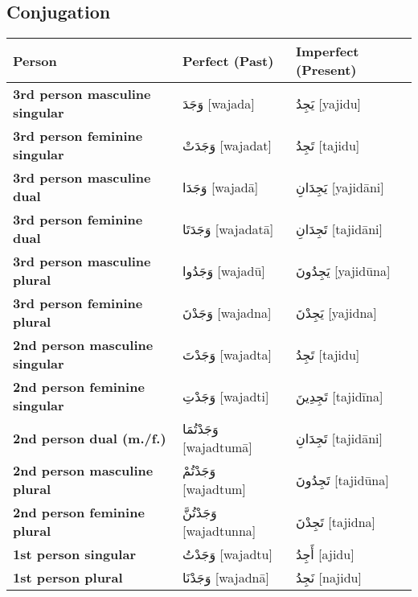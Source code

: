 \documentclass[letter,12pt]{article}
\begin{document}
\subsection{Conjugation}
\begin{longtable}{|>{\raggedright}p{3.5cm}|p{5cm}|p{5cm}|}
\hline
\textbf{Person} & \textbf{Perfect (Past)} & \textbf{Imperfect (Present)} \\
\hline
\textbf{3rd person masculine singular} & \textarabic{وَجَدَ} [wajada] & \textarabic{يَجِدُ} [yajidu] \\
\hline
\textbf{3rd person feminine singular} & \textarabic{وَجَدَتْ} [wajadat] & \textarabic{تَجِدُ} [tajidu] \\
\hline
\textbf{3rd person masculine dual} & \textarabic{وَجَدَا} [wajadā] & \textarabic{يَجِدَانِ} [yajidāni] \\
\hline
\textbf{3rd person feminine dual} & \textarabic{وَجَدَتَا} [wajadatā] & \textarabic{تَجِدَانِ} [tajidāni] \\
\hline
\textbf{3rd person masculine plural} & \textarabic{وَجَدُوا} [wajadū] & \textarabic{يَجِدُونَ} [yajidūna] \\
\hline
\textbf{3rd person feminine plural} & \textarabic{وَجَدْنَ} [wajadna] & \textarabic{يَجِدْنَ} [yajidna] \\
\hline
\textbf{2nd person masculine singular} & \textarabic{وَجَدْتَ} [wajadta] & \textarabic{تَجِدُ} [tajidu] \\
\hline
\textbf{2nd person feminine singular} & \textarabic{وَجَدْتِ} [wajadti] & \textarabic{تَجِدِينَ} [tajidīna] \\
\hline
\textbf{2nd person dual (m./f.)} & \textarabic{وَجَدْتُمَا} [wajadtumā] & \textarabic{تَجِدَانِ} [tajidāni] \\
\hline
\textbf{2nd person masculine plural} & \textarabic{وَجَدْتُمْ} [wajadtum] & \textarabic{تَجِدُونَ} [tajidūna] \\
\hline
\textbf{2nd person feminine plural} & \textarabic{وَجَدْتُنَّ} [wajadtunna] & \textarabic{تَجِدْنَ} [tajidna] \\
\hline
\textbf{1st person singular} & \textarabic{وَجَدْتُ} [wajadtu] & \textarabic{أَجِدُ} [ajidu] \\
\hline
\textbf{1st person plural} & \textarabic{وَجَدْنَا} [wajadnā] & \textarabic{نَجِدُ} [najidu] \\
\hline
\end{longtable}
\end{document}
